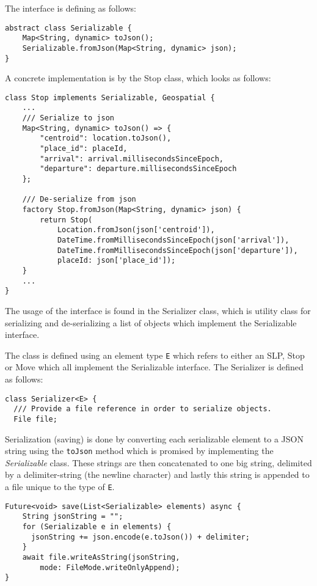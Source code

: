 The interface is defining as follows:
\begin{verbatim}
abstract class Serializable {
    Map<String, dynamic> toJson();
    Serializable.fromJson(Map<String, dynamic> json);
}
\end{verbatim}

A concrete implementation is by the Stop class, which looks as follows:

\begin{verbatim}
class Stop implements Serializable, Geospatial { 
    ...
    /// Serialize to json
    Map<String, dynamic> toJson() => {
        "centroid": location.toJson(),
        "place_id": placeId,
        "arrival": arrival.millisecondsSinceEpoch,
        "departure": departure.millisecondsSinceEpoch
    };

    /// De-serialize from json
    factory Stop.fromJson(Map<String, dynamic> json) {
        return Stop(
            Location.fromJson(json['centroid']),
            DateTime.fromMillisecondsSinceEpoch(json['arrival']),
            DateTime.fromMillisecondsSinceEpoch(json['departure']),
            placeId: json['place_id']);
    }
    ...
}
\end{verbatim}

The usage of the interface is found in the Serializer class, which is utility class for serializing and de-serializing a list of objects which implement the Serializable interface.

The class is defined using an element type \verb|E| which refers to either an SLP, Stop or Move which all implement the Serializable interface. The Serializer is defined as follows:
\begin{verbatim}
class Serializer<E> {
  /// Provide a file reference in order to serialize objects.
  File file;
\end{verbatim}

Serialization (saving) is done by converting each serializable element to a JSON string using the \verb|toJson| method which is promised by implementing the \textit{Serializable} class. These strings are then concatenated to one big string, delimited by a delimiter-string (the newline character) and lastly this string is appended to a file unique to the type of \verb|E|.

\begin{verbatim}
Future<void> save(List<Serializable> elements) async {
    String jsonString = "";
    for (Serializable e in elements) {
      jsonString += json.encode(e.toJson()) + delimiter;
    }
    await file.writeAsString(jsonString, 
        mode: FileMode.writeOnlyAppend);
}
\end{verbatim}

